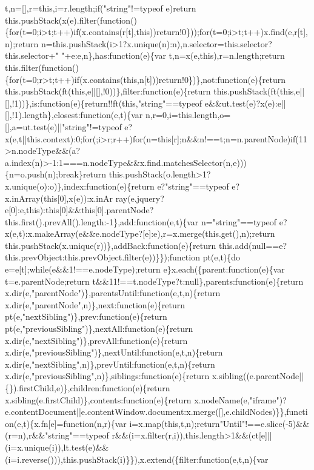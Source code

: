 \begin{DoxyCode}
{       t,n=[],r=this,i=r.length;if("string"!=typeof e)return
       this.pushStack(x(e).filter(function()\{for(t=0;i>t;t++)if(x.contains(r[t],this))return!0\}));for(t=0;i>t;t++)x.find(e,r[t],n);return
       n=this.pushStack(i>1?x.unique(n):n),n.selector=this.selector?this.selector+" "+e:e,n\},has:function(e)\{var t,n=x(e,this),r=n.length;return
       this.filter(function()\{for(t=0;r>t;t++)if(x.contains(this,n[t]))return!0\})\},not:function(e)\{return
       this.pushStack(ft(this,e||[],!0))\},filter:function(e)\{return
       this.pushStack(ft(this,e||[],!1))\},is:function(e)\{return!!ft(this,"string"==typeof e&&ut.test(e)?x(e):e||[],!1).length\},closest:function(e,t)\{var
       n,r=0,i=this.length,o=[],a=ut.test(e)||"string"!=typeof
       e?x(e,t||this.context):0;for(;i>r;r++)for(n=this[r];n&&n!==t;n=n.parentNode)if(11>n.nodeType&&(a?a.index(n)>-1:1===n.nodeType&&x.find.matchesSelector(n,e)))\{n=o.push(n);break\}return
       this.pushStack(o.length>1?x.unique(o):o)\},index:function(e)\{return e?"string"==typeof
       e?x.inArray(this[0],x(e)):x.inAr
      ray(e.jquery?e[0]:e,this):this[0]&&this[0].parentNode?this.first().prevAll().length:-1\},add:function(e,t)\{var n="string"==typeof e?x(e,t):x.makeArray(e&&e.nodeType?[e]:e),r=x.merge(this.get(),n);return
       this.pushStack(x.unique(r))\},addBack:function(e)\{return
       this.add(null==e?this.prevObject:this.prevObject.filter(e))\}\});function pt(e,t)\{do e=e[t];while(e&&1!==e.nodeType);return e\}x.each(\{parent:function(e)\{var
       t=e.parentNode;return t&&11!==t.nodeType?t:null\},parents:function(e)\{return
       x.dir(e,"parentNode")\},parentsUntil:function(e,t,n)\{return x.dir(e,"parentNode",n)\},next:function(e)\{return pt(e,"nextSibling")\},prev:function(e)\{return
       pt(e,"previousSibling")\},nextAll:function(e)\{return x.dir(e,"nextSibling")\},prevAll:function(e)\{return
       x.dir(e,"previousSibling")\},nextUntil:function(e,t,n)\{return
       x.dir(e,"nextSibling",n)\},prevUntil:function(e,t,n)\{return x.dir(e,"previousSibling",n)\},siblings:function(e)\{return
       x.sibling((e.parentNode||\{\}).firstChild,e)\},children:function(e)\{return x.sibling(e.firstChild)\},contents:function(e)\{return
       x.nodeName(e,"iframe")?e.contentDocument||e.contentWindow.document:x.merge([],e.childNodes)\}\},function(e,t)\{x.fn[e]=function(n,r)\{var
       i=x.map(this,t,n);return"Until"!==e.slice(-5)&&(r=n),r&&"string"==typeof
       r&&(i=x.filter(r,i)),this.length>1&&(ct[e]||(i=x.unique(i)),lt.test(e)&&(i=i.reverse())),this.pushStack(i)\}\}),x.extend(\{filter:function(e,t,n)\{var
}
\end{DoxyCode}
